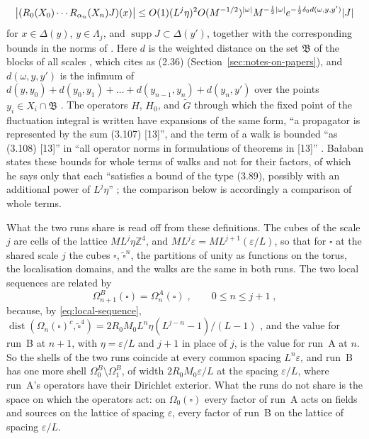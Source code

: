 \documentclass[11pt]{preprint}
\newcommand{\dist}{\operatorname{dist}}
\DeclarePairedDelimiter{\abs}{\lvert}{\rvert}
\numberwithin{equation}{section}
\theoremstyle{definition}
\theoremstyle{remark}
\theoremstyle{plain}
\begin{document}
\begin{equation}\label{eq:walk-bound}
    \bigl\lvert(R_0(X_0)\cdots R_{\alpha_n}(X_n)J)(x)\bigr\rvert \leq O(1)(L^j\eta)^2O(M^{-1/2})^{\abs{\omega}}M^{-\frac12\abs{\omega}}e^{-\frac12\delta_0d(\omega, y, y')}\abs{J}
\end{equation}
for $x \in \Delta(y)$, $y \in \Lambda_j$, and $\operatorname{supp}J \subset \Delta(y')$, together with the corresponding bounds in the norms of \cite[(3.42)--(3.47)]{BalabanPBG} \cite[Theorem~3.10, (3.107), (3.108), p.~416]{BalabanPBG}. Here $d$ is the weighted distance on the set $\mathfrak B$ of the blocks of all scales \cite[(2.46), p.~231]{BalabanPRT2}, which \cite[p.~397]{BalabanPBG} cites as (2.36) (Section~\ref{sec:notes-on-papers}), and $d(\omega, y, y')$ is the infimum of $d(y, y_0) + d(y_0, y_1) + \dots + d(y_{n-1}, y_n) + d(y_n, y')$ over the points $y_i \in X_i \cap \mathfrak B$ \cite[(3.93), p.~410, and p.~413]{BalabanPBG}. The operators $H$, $H_0$, and $\tilde G$ through which the fixed point of the fluctuation integral is written \cite[(1.2)--(1.4), p.~2]{BalabanRG2} have expansions of the same form, ``a propagator is represented by the sum (3.107) [13]'', and the term of a walk is bounded ``as (3.108) [13]'' in ``all operator norms in formulations of theorems in [13]'' \cite[(1.6), (1.7), p.~3]{BalabanRG2}. Ba{\l}aban states these bounds for whole terms of walks and not for their factors, of which he says only that each ``satisfies a bound of the type (3.89), possibly with an additional power of $L^j\eta$'' \cite[p.~413]{BalabanPBG}; the comparison below is accordingly a comparison of whole terms.

What the two runs share is read off from these definitions. The cubes of the scale $j$ are cells of the lattice $ML^j\eta\mathbb Z^4$, and $ML^j\varepsilon = ML^{j+1}(\varepsilon/L)$, so that for $\square$ at the shared scale $j$ the cubes $\square$, $\tilde\square^n$, the partitions of unity as functions on the torus, the localisation domains, and the walks are the same in both runs. The two local sequences are related by
\begin{equation}\label{eq:shared-shells}
    \Omega^B_{n+1}(\square) = \Omega^A_n(\square)\;,
    \qquad 0 \leq n \leq j + 1\;,
\end{equation}
because, by \eqref{eq:local-sequence}, $\dist(\Omega_n(\square)^c, \tilde\square^4) = 2R_0M_0L^n\eta(L^{j-n} - 1)/(L - 1)$ \cite[p.~408]{BalabanPBG}, and the value for run~B at $n + 1$, with $\eta = \varepsilon/L$ and $j + 1$ in place of $j$, is the value for run~A at $n$. So the shells of the two runs coincide at every common spacing $L^n\varepsilon$, and run~B has one more shell $\Omega^B_0 \setminus \Omega^B_1$, of width $2R_0M_0\varepsilon/L$ at the spacing $\varepsilon/L$, where run~A's operators have their Dirichlet exterior. What the runs do not share is the space on which the operators act: on $\Omega_0(\square)$ every factor of run~A acts on fields and sources on the lattice of spacing $\varepsilon$, every factor of run~B on the lattice of spacing $\varepsilon/L$.
\end{document}
